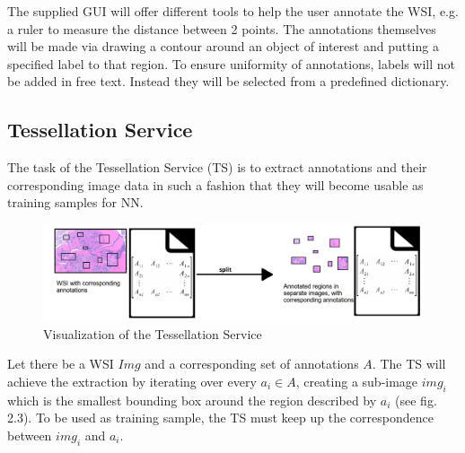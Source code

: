 The supplied GUI will offer different tools to help the user annotate the WSI, e.g. a ruler to measure the distance between 2 points. The annotations themselves will be made via drawing a contour around an object of interest and putting a specified label to that region. To ensure uniformity of annotations, labels will not be added in free text. Instead they will be selected from a predefined dictionary.


\subsection{Tessellation Service}

The task of the Tessellation Service (TS) is to extract annotations and their corresponding image data in such a fashion that they will become usable as training samples for NN.

\begin{figure}[H]
	\begin{center}
		\includegraphics[scale=0.25]{img/processChainC.png}
		\caption{Visualization of the Tessellation Service}
		\label{fig:fig2.6}
	\end{center}
\end{figure}

Let there be a WSI $Img$ and a corresponding set of annotations $A$. The TS will achieve the extraction by iterating over every $a_i \in A$, creating a sub-image $img_i$ which is the smallest bounding box around the region described by $a_i$ (see fig. 2.3). To be used as training sample, the TS must keep up the correspondence between $img_i$ and $a_i$.